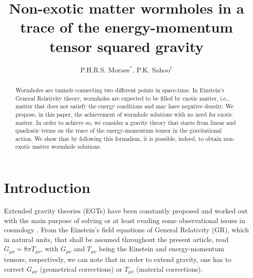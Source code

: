 \documentclass[twocolumn,showpacs,aps,amssymb,floatfix,prd,amsmath,preprintnumbers]{revtex4}
\begin{document}

\title{Non-exotic matter wormholes in a trace of the energy-momentum tensor squared gravity}

\author{
    P.H.R.S. Moraes$^{*}$, P.K. Sahoo$^{\dagger}$}

\begin{abstract}

Wormholes are tunnels connecting two different points in space-time. In Einstein's General Relativity theory, wormholes are expected to be filled by exotic matter, i.e., matter that does not satisfy the energy conditions and may have negative density. We propose, in this paper, the achievement of wormhole solutions with no need for exotic matter. In order to achieve so, we consider a gravity theory that starts from linear and quadratic terms on the trace of the energy-momentum tensor in the gravitational action. We show that by following this formalism, it is possible, indeed, to obtain non-exotic matter wormhole solutions.

\end{abstract}




\maketitle



\section{Introduction}

Extended gravity theories (EGTs) have been constantly proposed and worked out with the main purpose of solving or at least evading some observational issues in cosmology \cite{padmanabhan/2003,capozziello/2008,bull/2016}. From the Einstein's field equations of General Relativity (GR), which in natural units, that shall be assumed throughout the present article, read $G_{\mu\nu}=8\pi T_{\mu\nu}$, with $G_{\mu\nu}$ and $T_{\mu\nu}$ being the Einstein and energy-momentum tensors, respectively, we can note that in order to extend gravity, one has to correct $G_{\mu\nu}$ (geometrical corrections) or $T_{\mu\nu}$ (material corrections).
\end{document}
